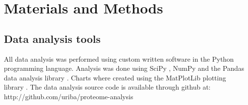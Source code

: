 \section{Materials and Methods}
\subsection{Data analysis tools}
All data analysis was performed using custom written software in the Python programming language.
Analysis was done using SciPy \cite{Oliphant2007}, NumPy \cite{Community2011} and the Pandas data analysis library \cite{McKinney2011}.
Charts where created using the MatPlotLib plotting library \cite{Hunter2007}.
The data analysis source code is available through github at: http://github.com/uriba/proteome-analysis